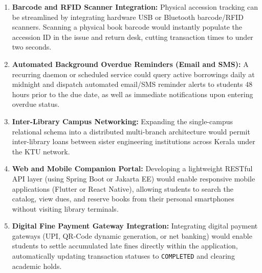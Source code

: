 \begin{enumerate}
    \item \textbf{Barcode and RFID Scanner Integration:}
    Physical accession tracking can be streamlined by integrating hardware USB or Bluetooth barcode/RFID scanners. Scanning a physical book barcode would instantly populate the accession ID in the issue and return desk, cutting transaction times to under two seconds.

    \item \textbf{Automated Background Overdue Reminders (Email and SMS):}
    A recurring daemon or scheduled service could query active borrowings daily at midnight and dispatch automated email/SMS reminder alerts to students 48 hours prior to the due date, as well as immediate notifications upon entering overdue status.

    \item \textbf{Inter-Library Campus Networking:}
    Expanding the single-campus relational schema into a distributed multi-branch architecture would permit inter-library loans between sister engineering institutions across Kerala under the KTU network.

    \item \textbf{Web and Mobile Companion Portal:}
    Developing a lightweight RESTful API layer (using Spring Boot or Jakarta EE) would enable responsive mobile applications (Flutter or React Native), allowing students to search the catalog, view dues, and reserve books from their personal smartphones without visiting library terminals.

    \item \textbf{Digital Fine Payment Gateway Integration:}
    Integrating digital payment gateways (UPI, QR-Code dynamic generation, or net banking) would enable students to settle accumulated late fines directly within the application, automatically updating transaction statuses to \texttt{COMPLETED} and clearing academic holds.
\end{enumerate}
